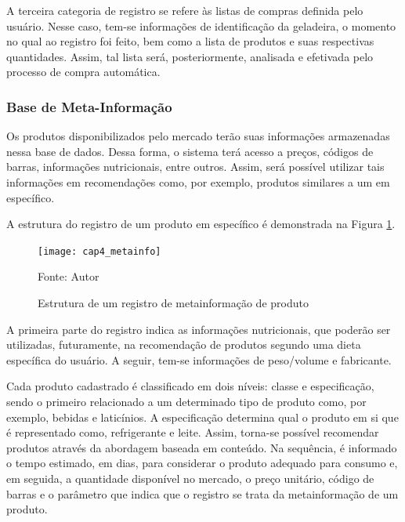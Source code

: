 A terceira categoria de registro se refere às listas de compras definida pelo usuário. Nesse caso, tem-se informações de identificação da geladeira, o momento no qual ao registro foi feito, bem como a lista de produtos e suas respectivas quantidades. Assim, tal lista será, posteriormente, analisada e efetivada pelo processo de compra automática.



\subsubsection{Base de Meta-Informação}


Os produtos disponibilizados pelo mercado terão suas informações armazenadas nessa base de dados. Dessa forma, o sistema terá acesso a preços, códigos de barras, informações nutricionais, entre outros. Assim, será possível utilizar tais informações em recomendações como, por exemplo, produtos similares a um em específico. 

A estrutura do registro de um produto em específico é demonstrada na Figura \ref{fig:cap4_metainfo}.


\begin{figure}[htb]
    \caption{Estrutura de um registro de metainformação de produto}
    \label{fig:cap4_metainfo}
    \texttt{[image: cap4\_metainfo]}
    
    Fonte: Autor
\end{figure}

A primeira parte do registro indica as informações nutricionais, que poderão ser utilizadas, futuramente, na recomendação de produtos segundo uma dieta específica do usuário. A seguir, tem-se informações de peso/volume e fabricante.

Cada produto cadastrado é classificado em dois níveis: classe e especificação, sendo o primeiro relacionado a um determinado tipo de produto como, por exemplo, bebidas e laticínios. A especificação determina qual o produto em si que é representado como, refrigerante e leite. Assim, torna-se possível recomendar produtos através da abordagem baseada em conteúdo.
Na sequência, é informado o tempo estimado, em dias, para considerar o produto adequado para consumo e, em seguida, a quantidade disponível no mercado, o preço unitário, código de barras e o parâmetro que indica que o registro se trata da metainformação de um produto.

